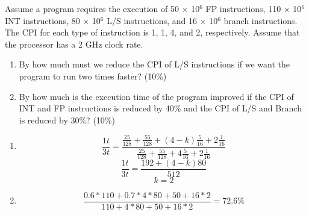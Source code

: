 \documentclass[12pt, a4paper]{article}
\begin{document}
\begin{q}{20}
    Assume a program requires the execution of 50 × 10$^6$ FP instructions, 110 × 10$^6$ INT instructions, 80 × 10$^6$ L/S instructions, and 16 × 10$^6$ branch instructions. The CPI for each type of instruction is 1, 1, 4, and 2, respectively. Assume that the processor has a 2 GHz clock rate. 
    \begin{enumerate}
        \item By how much must we reduce the CPI of L/S instructions if we want the program to run two times faster? (10\%)
        \item By how much is the execution time of the program improved if the CPI of INT and FP instructions is reduced by 40\% and the CPI of L/S and Branch is reduced by 30\%? (10\%)
    \end{enumerate}
\end{q}
\begin{ans}
    \begin{enumerate}
        \item 
        $$\frac{1t}{3t} = \frac{\frac{25}{128} + \frac{55}{128} + (4-k)\frac{5}{16} + 2\frac{1}{16}}{\frac{25}{128} + \frac{55}{128} + 4\frac{5}{16} + 2\frac{1}{16}}$$
        $$\frac{1t}{3t} = \frac{192+(4-k)80}{512}$$
        $$k = 2$$
        \item $$\frac{0.6*110 + 0.7*4*80 + 50 + 16*2}{110 + 4*80 + 50+16*2} = 72.6\%$$
    \end{enumerate}
\end{ans}
\end{document}
